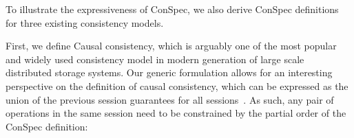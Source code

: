 \documentclass[journal,compsoc]{IEEEtran}
\begin{document}

To illustrate the expressiveness of ConSpec, we also derive ConSpec definitions for three existing consistency models.
  
First, we define Causal consistency, which is arguably one of the most popular and widely used consistency model in modern generation of large scale distributed storage systems. Our generic formulation allows for an interesting perspective on the definition of causal consistency, which can be expressed as the union of the previous session guarantees for all sessions~\cite{Ahamad:1993:PPC:165231.165264}. As such, any pair of operations in the same session need to be constrained by the partial order of the ConSpec definition:
\end{document}
